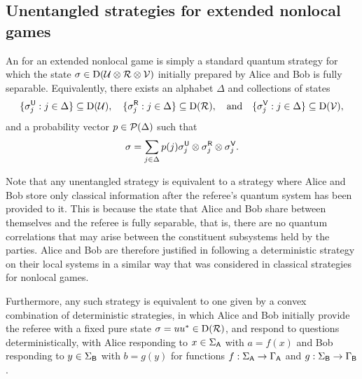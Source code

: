 \subsection{Unentangled strategies for extended nonlocal games} \label{sec:unentangled-strategies-extended-nonlocal-games}

An  for an extended nonlocal game is simply a standard quantum strategy for which the state $\sigma \in \Density(\U \otimes \R \otimes \V)$ initially prepared by Alice and Bob is fully separable. Equivalently, there exists an alphabet $\Delta$ and collections of states 
\begin{align}
	\{ \sigma_j^{\reg{U}} : j \in \Delta \} \subseteq \Density(\U), \quad \{ \sigma_j^{\reg{R}} : j \in \Delta \} \subseteq \Density(\R), \quad \textnormal{and} \quad \{ \sigma_j^{\reg{V}} : j \in \Delta \} \subseteq \Density(\V),
\end{align}
and a probability vector $p \in \P(\Delta)$ such that 
\begin{align}
	\sigma = \sum_{j \in \Delta} p(j) \sigma_j^{\reg{U}} \otimes \sigma_j^{\reg{R}} \otimes \sigma_j^{\reg{V}}.
\end{align} 

Note that any unentangled strategy is equivalent to a strategy where Alice and Bob store only classical information after the referee's quantum system has been provided to it. This is because the state that Alice and Bob share between themselves and the referee is fully separable, that is, there are no quantum correlations that may arise between the constituent subsystems held by the parties. Alice and Bob are therefore justified in following a deterministic strategy on their local systems in a similar way that was considered in classical strategies for nonlocal games.  


Furthermore, any such strategy is equivalent to one given by a convex combination of deterministic strategies, in which Alice and Bob initially provide the referee with a fixed pure state $\sigma = uu^* \in \Density(\R)$, and respond to questions deterministically, with Alice responding to $x \in \SigmaA$ with $a = f(x)$ and Bob responding to $y \in \SigmaB$ with $b = g(y)$ for functions $f: \SigmaA \rightarrow \GammaA$ and $g : \SigmaB \rightarrow \GammaB$.

